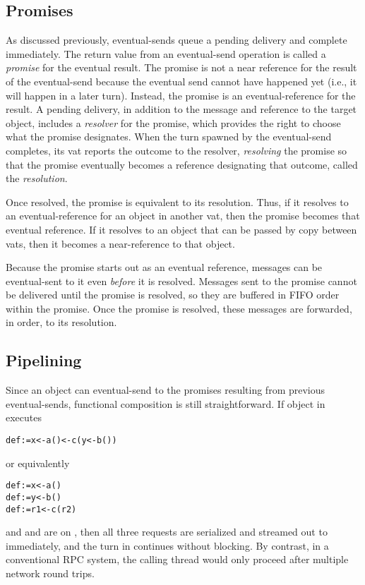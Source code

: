 \documentclass{llncs}
\begin{document}
\subsection{Promises}

As discussed previously, eventual-sends queue a pending delivery and
complete immediately.  The return value from an eventual-send
operation is called a \emph{promise} for the eventual result. The
promise is not a near reference for the result of the eventual-send
because the eventual send cannot have happened yet (i.e., it will
happen in a later turn). Instead, the promise is an eventual-reference
for the result.  A pending delivery, in addition to the message and
reference to the target object, includes a \emph{resolver} for the
promise, which provides the right to choose what the promise
designates. When the turn spawned by the eventual-send completes, its
vat reports the outcome to the resolver, \emph{resolving} the promise
so that the promise eventually becomes a reference designating that
outcome, called the \emph{resolution}.  

Once resolved, the promise is equivalent to its resolution. Thus, if
it resolves to an eventual-reference for an object in another vat,
then the promise becomes that eventual reference. If it resolves to
an object that can be passed by copy between vats, then it becomes a
near-reference to that object.

Because the promise starts out as an eventual reference, messages can
be eventual-sent to it even \emph{before} it is resolved. Messages
sent to the promise cannot be delivered until the promise is resolved,
so they are buffered in FIFO order within the promise. Once the
promise is resolved, these messages are forwarded, in order, to its
resolution.

\subsection{Pipelining}

Since an object can eventual-send to the promises resulting from
previous eventual-sends, functional composition is still
straightforward. If object  in  executes
%
\begin{alltt}
    def  := x <- a() <- c(y <- b())
\end{alltt}
%
or equivalently
%
\begin{alltt}
    def  := x <- a()
    def  := y <- b()
    def  := r1 <- c(r2)
\end{alltt}
%
and  and  are on , then all three requests are
serialized and streamed out to  immediately, and the turn in
 continues without blocking. By contrast, in a conventional RPC
system, the calling thread would only proceed after multiple network
round trips.
\end{document}
